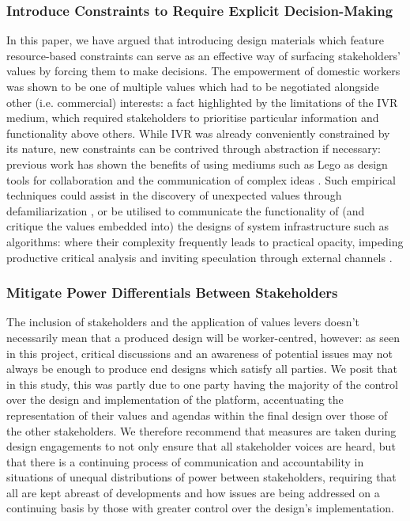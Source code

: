 \subsubsection{Introduce Constraints to Require Explicit Decision-Making}
In this paper, we have argued that introducing design materials which feature resource-based constraints can serve as an effective way of surfacing stakeholders' values by forcing them to make decisions. The empowerment of domestic workers was shown to be one of multiple values which had to be negotiated alongside other (i.e. commercial) interests: a fact highlighted by the limitations of the IVR medium, which required stakeholders to prioritise particular information and functionality above others. While IVR was already conveniently constrained by its nature, new constraints can be contrived through abstraction if necessary: previous work has shown the benefits of using mediums such as Lego as design tools for collaboration and the communication of complex ideas \cite{Cantoni2009}. Such empirical techniques could assist in the discovery of unexpected values through defamiliarization \cite{LeDantec2009}, or be utilised to communicate the functionality of (and critique the values embedded into) the designs of system infrastructure such as algorithms: where their complexity frequently leads to practical opacity, impeding productive critical analysis and inviting speculation through external channels \cite{lee2015}.

\subsubsection{Mitigate Power Differentials Between Stakeholders}

The inclusion of stakeholders and the application of values levers doesn't necessarily mean that a produced design will be worker-centred, however: as seen in this project, critical discussions and an awareness of potential issues may not always be enough to produce end designs which satisfy all parties. We posit that in this study, this was partly due to one party having the majority of the control over the design and implementation of the platform, accentuating the representation of their values and agendas within the final design over those of the other stakeholders. We therefore recommend that measures are taken during design engagements to not only ensure that all stakeholder voices are heard, but that there is a continuing process of communication and accountability in situations of unequal distributions of power between stakeholders, requiring that all are kept abreast of developments and how issues are being addressed on a continuing basis by those with greater control over the design's implementation.